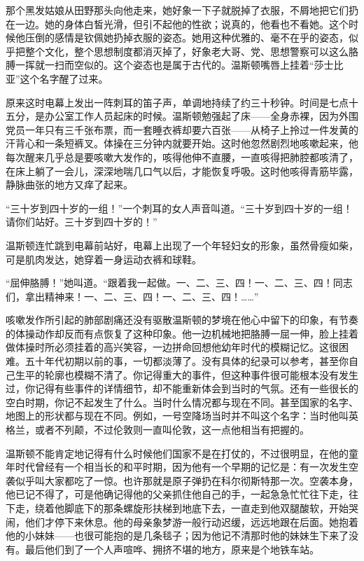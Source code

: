那个黑发姑娘从田野那头向他走来，她好象一下子就脱掉了衣服，不屑地把它们扔在一边。她的身体白皙光滑，但引不起他的性欲；说真的，他看也不看她。这个时候他压倒的感情是钦佩她扔掉衣服的姿态。她用这种优雅的、毫不在乎的姿态，似乎把整个文化，整个思想制度都消灭掉了，好象老大哥、党、思想警察可以这么胳膊一挥就一扫而空似的。这个姿态也是属于古代的。温斯顿嘴唇上挂着“莎士比亚”这个名字醒了过来。


原来这时电幕上发出一阵刺耳的笛子声，单调地持续了约三十秒钟。时间是七点十五分，是办公室工作人员起床的时候。温斯顿勉强起了床——全身赤裸，因为外围党员一年只有三千张布票，而一套睡衣裤却要六百张——从椅子上拎过一件发黄的汗背心和一条短裤叉。体操在三分钟内就要开始。这时他忽然剧烈地咳嗽起来，他每次醒来几乎总是要咳嗽大发作的，咳得他伸不直腰，一直咳得把肺腔都咳清了，在床上躺了一会儿，深深地喘几口气以后，才能恢复呼吸。这时他咳得青筋毕露，静脉曲张的地方又痒了起来。


“三十岁到四十岁的一组！”一个刺耳的女人声音叫道。“三十岁到四十岁的一组！请你们站好。三十岁到四十岁的！”


温斯顿连忙跳到电幕前站好，电幕上出现了一个年轻妇女的形象，虽然骨瘦如柴，可是肌肉发达，她穿着一身运动衣裤和球鞋。


“屈伸胳膊！”她叫道。“跟着我一起做。一、二、三、四！一、二、三、四！同志们，拿出精神来！一、二、三、四！一、二、三、四！……”


咳嗽发作所引起的肺部剧痛还没有驱散温斯顿的梦境在他心中留下的印象，有节奏的体操动作却反而有点恢复了这种印象。他一边机械地把胳膊一屈一伸，脸上挂着做体操时所必须挂着的高兴笑容，一边拼命回想他幼年时代的模糊记忆。这很困难。五十年代初期以前的事，一切都淡薄了。没有具体的纪录可以参考，甚至你自己生平的轮廓也模糊不清了。你记得重大的事件，但这种事件很可能根本没有发生过，你记得有些事件的详情细节，却不能重新体会到当时的气氛。还有一些很长的空白时期，你记不起发生了什么。当时什么情况都与现在不同。甚至国家的名字、地图上的形状都与现在不同。例如，一号空降场当时并不叫这个名字：当时他叫英格兰，或者不列颠，不过伦敦则一直叫伦敦，这一点他相当有把握的。


温斯顿不能肯定地记得有什么时候他们国家不是在打仗的，不过很明显，在他的童年时代曾经有一个相当长的和平时期，因为他有一个早期的记忆是：有一次发生空袭似乎叫大家都吃了一惊。也许那就是原子弹扔在科尔彻斯特那一次。空袭本身，他已记不得了，可是他确记得他的父亲抓住他自己的手，一起急急忙忙往下走，往下走，绕着他脚底下的那条螺旋形扶梯到地底下去，一直走到他双腿酸软，开始哭闹，他们才停下来休息。他的母亲象梦游一般行动迟缓，远远地跟在后面。她抱着他的小妹妹——也很可能抱的是几条毯子；因为他记不清那时他的妹妹生下来了没有。最后他们到了一个人声喧哗、拥挤不堪的地方，原来是个地铁车站。


